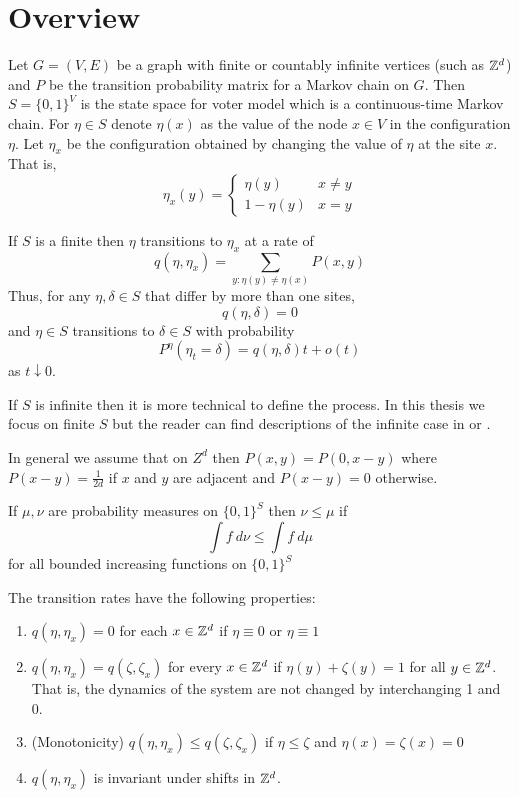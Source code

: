 \section{Overview}

\begin{defn} \cite{Liggett2002}
Let $G = (V,E)$ be a graph with finite or countably infinite vertices (such as $\mathbb{Z}^d$) and $P$ be the transition probability matrix for a Markov chain on $G$.
Then $S = \{0,1\}^{V}$ is the state space for voter model which is a continuous-time Markov chain.
For $\eta \in S$ denote $\eta(x)$ as the value of the node $x \in V$ in the configuration $\eta$.
Let $\eta_x$ be the configuration obtained by changing the value of $\eta$ at the site $x$. That is,
$$
\eta_x(y) = \begin{cases}
    \eta(y) & x \not = y\\
    1 - \eta(y) & x = y
\end{cases}
$$

If $S$ is a finite then $\eta$ transitions to $\eta_x$ at a rate of
$$
q(\eta, \eta_x) = \sum_{y : \eta(y) \not = \eta(x)} P(x,y)
$$
Thus, for any $\eta, \delta \in S$ that differ by more than one sites,
$$
q(\eta, \delta) = 0
$$
and $\eta \in S$ transitions to $\delta \in S$ with probability
$$
P^\eta(\eta_t = \delta) = q(\eta, \delta) t + o(t)
$$
as $t \downarrow 0$.

If $S$ is infinite then it is more technical to define the process. In this thesis we focus on finite $S$ but the reader can find descriptions of the infinite case in \cite{Liggett1999} or \cite{Liggett2002}.

In general we assume that on $Z^d$ then $P(x,y) = P(0, x - y)$
where $P(x- y) = \frac{1}{2d}$ if $x$ and $y$ are adjacent and $P(x-y) = 0$ otherwise.
\end{defn}

\begin{defn} \cite{Liggett1999}
If $\mu, \nu$ are probability measures on $\{0,1\}^S$ then $\nu \leq \mu$ if
$$
\int f~d\nu \leq \int f~d\mu
$$
for all bounded increasing functions on $\{0,1\}^S$
\end{defn}

\begin{theorem}
The transition rates have the following properties:
\begin{enumerate}
    \item $q(\eta, \eta_x) = 0$ for each $x \in \mathbb{Z}^d$ if $\eta \equiv 0$ or $\eta \equiv 1$
    \item $q(\eta, \eta_x) = q(\zeta, \zeta_x)$ for every $x \in \mathbb{Z}^d$ if $\eta(y) + \zeta(y) = 1$ for all $y \in \mathbb{Z}^d$. That is, the dynamics of the system are not changed by interchanging 1 and 0.
    \item (Monotonicity) $q(\eta, \eta_x) \leq q(\zeta, \zeta_x)$ if $\eta \leq \zeta$ and $\eta(x) = \zeta(x) = 0$
    \item $q(\eta, \eta_x)$ is invariant under shifts in $\mathbb{Z}^d$.
\end{enumerate}
\end{theorem}


